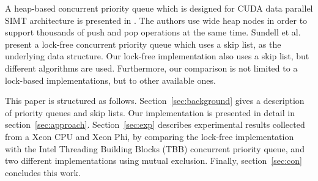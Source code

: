 A heap-based concurrent priority queue which is designed for CUDA data parallel SIMT architecture is presented in \cite{DBLP:conf/hipc/HeAP12}.
The authors use wide heap nodes in order to support thousands of push and pop operations at the same time.
Sundell et al.~\cite{Sundell:2005:FLC:1073765.1073770} present a lock-free concurrent priority queue which uses a skip list, as the underlying data structure.
Our lock-free implementation also uses a skip list, but different algorithms are used. Furthermore, our comparison is not limited to a lock-based implementations, but to other available ones.

This paper is structured as follows.
Section~\ref{sec:background} gives a description of priority queues and skip lists.
Our implementation is presented in detail in section~\ref{sec:approach}. Section~\ref{sec:exp} describes experimental results collected from a Xeon CPU and Xeon Phi, by comparing the lock-free implementation with the Intel Threading Building Blocks (TBB) concurrent priority queue, and two different implementations using mutual exclusion. Finally, section~\ref{sec:con} concludes this work.
